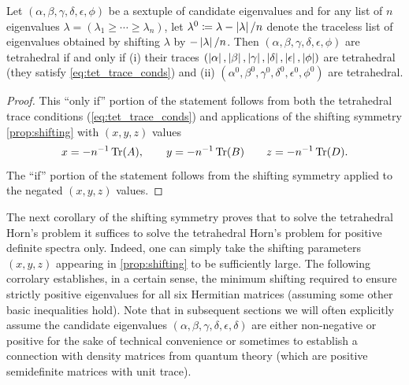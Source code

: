 \documentclass[notitlepage, 10pt]{article}
\begin{document}
\begin{cor}
    \label{cor:traceless}
    Let $(\alpha, \beta, \gamma, \delta, \epsilon, \phi)$ be a sextuple of candidate eigenvalues and for any list of $n$ eigenvalues $\lambda = (\lambda_1 \geq \cdots \geq \lambda_n)$, let $\lambda^{0} \coloneqq \lambda - \left|\lambda\right|/n$ denote the traceless list of eigenvalues obtained by shifting $\lambda$ by $-\left|\lambda\right|/n$.
    Then $(\alpha, \beta, \gamma, \delta, \epsilon, \phi)$ are tetrahedral if and only if (i) their traces $(\left|\alpha\right|, \left|\beta\right|, \left|\gamma\right|, \left|\delta\right|, \left|\epsilon\right|, \left|\phi\right|)$ are tetrahedral (they satisfy \cref{eq:tet_trace_conds}) and (ii) $(\alpha^0, \beta^0, \gamma^0, \delta^0, \epsilon^0, \phi^0)$ are tetrahedral.
\end{cor}
\begin{proof}
    This ``only if'' portion of the statement follows from both the tetrahedral trace conditions (\cref{eq:tet_trace_conds}) and applications of the shifting symmetry \cref{prop:shifting} with $(x,y,z)$ values
    \begin{equation}
        x = - n^{-1}\operatorname{Tr}(A), \qquad
        y = - n^{-1}\operatorname{Tr}(B) \qquad
        z = - n^{-1}\operatorname{Tr}(D).
    \end{equation}
    The ``if'' portion of the statement follows from the shifting symmetry applied to the negated $(x,y,z)$ values.
\end{proof}
The next corollary of the shifting symmetry proves that to solve the tetrahedral Horn's problem it suffices to solve the tetrahedral Horn's problem for positive definite spectra only.
Indeed, one can simply take the shifting parameters $(x,y,z)$ appearing in \cref{prop:shifting} to be sufficiently large.
The following corrolary establishes, in a certain sense, the minimum shifting required to ensure strictly positive eigenvalues for all six Hermitian matrices (assuming some other basic inequalities hold).
Note that in subsequent sections we will often explicitly assume the candidate eigenvalues $(\alpha,\beta,\gamma,\delta,\epsilon,\delta)$ are either non-negative or positive for the sake of technical convenience or sometimes to establish a connection with density matrices from quantum theory (which are positive semidefinite matrices with unit trace).
\end{document}
